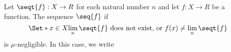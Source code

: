 Let $\seqt{f}: X \to R$ for each natural
number $n$
and let
$f: X \to R$
be a function.
The sequence $\seq{f}$
if
\[
  \Set*{x \in X}{\lim_{n} \seqt{f} \text{ does not exist, or } f(x) \neq \lim_{n} \seqt{f}}
\]
is $\mu$-negligible.
In this case, we write

\strats
\strats
